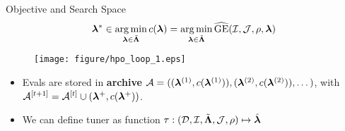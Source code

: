 \documentclass[11pt,compress,t,notes=noshow, xcolor=table]{beamer}
\begin{document}
\begin{vbframe}{Objective and Search Space}
\begin{eqnarray*}
    \bm{\lambda}^{*} \in \operatorname*{arg\,min}_{\bm{\lambda} \in \tilde{\bm{\Lambda}}} c(\bm{\lambda}) = \operatorname*{arg\,min}_{\bm{\lambda} \in \tilde{\bm{\Lambda}}}
    \widehat{\mathrm{GE}}(\mathcal{I}, \mathcal{J}, \rho, \bm{\lambda})
\end{eqnarray*}
\begin{figure}[h]
    \centering
    \texttt{[image: figure/hpo\_loop\_1.eps]}
\end{figure}

\begin{itemize}
    \item Evals are stored in \textbf{archive} $\mathcal{A} = ((\bm{\lambda}^{(1)}, c(\bm{\lambda}^{(1)})), (\bm{\lambda}^{(2)}, c(\bm{\lambda}^{(2)})), \dots)$, with $\mathcal{A}^{[t+1]} = \mathcal{A}^{[t]} \cup (\bm{\lambda}^+, c(\bm{\lambda}^+))$.


 \item We can define tuner as function $\tau: (\mathcal{D}, \mathcal{I}, \tilde{\bm{\Lambda}}, \mathcal{J}, \rho)\mapsto \hat{\bm{\lambda}}$
\end{itemize}



\end{vbframe}
\end{document}
